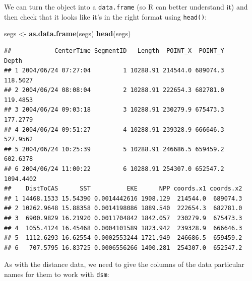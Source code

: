 \documentclass[]{book}
\newenvironment{Shaded}{\begin{snugshade}}{\end{snugshade}}
\newcommand{\KeywordTok}[1]{\textcolor[rgb]{0.13,0.29,0.53}{\textbf{#1}}}
\newcommand{\StringTok}[1]{\textcolor[rgb]{0.31,0.60,0.02}{#1}}
\newcommand{\OperatorTok}[1]{\textcolor[rgb]{0.81,0.36,0.00}{\textbf{#1}}}
\newcommand{\NormalTok}[1]{#1}
\theoremstyle{definition}
\theoremstyle{definition}
\theoremstyle{remark}
\begin{document}
We can turn the object into a \texttt{data.frame} (so R can better
understand it) and then check that it looks like it's in the right
format using \texttt{head()}:

\begin{Shaded}
\begin{Highlighting}[]
\NormalTok{segs <-}\StringTok{ }\KeywordTok{as.data.frame}\NormalTok{(segs)}
\KeywordTok{head}\NormalTok{(segs)}
\end{Highlighting}
\end{Shaded}

\begin{verbatim}
##            CenterTime SegmentID   Length  POINT_X  POINT_Y     Depth
## 1 2004/06/24 07:27:04         1 10288.91 214544.0 689074.3  118.5027
## 2 2004/06/24 08:08:04         2 10288.91 222654.3 682781.0  119.4853
## 3 2004/06/24 09:03:18         3 10288.91 230279.9 675473.3  177.2779
## 4 2004/06/24 09:51:27         4 10288.91 239328.9 666646.3  527.9562
## 5 2004/06/24 10:25:39         5 10288.91 246686.5 659459.2  602.6378
## 6 2004/06/24 11:00:22         6 10288.91 254307.0 652547.2 1094.4402
##    DistToCAS      SST          EKE      NPP coords.x1 coords.x2
## 1 14468.1533 15.54390 0.0014442616 1908.129  214544.0  689074.3
## 2 10262.9648 15.88358 0.0014198086 1889.540  222654.3  682781.0
## 3  6900.9829 16.21920 0.0011704842 1842.057  230279.9  675473.3
## 4  1055.4124 16.45468 0.0004101589 1823.942  239328.9  666646.3
## 5  1112.6293 16.62554 0.0002553244 1721.949  246686.5  659459.2
## 6   707.5795 16.83725 0.0006556266 1400.281  254307.0  652547.2
\end{verbatim}

As with the distance data, we need to give the columns of the data
particular names for them to work with \texttt{dsm}:

\begin{Shaded}
\end{Shaded}
\end{document}
